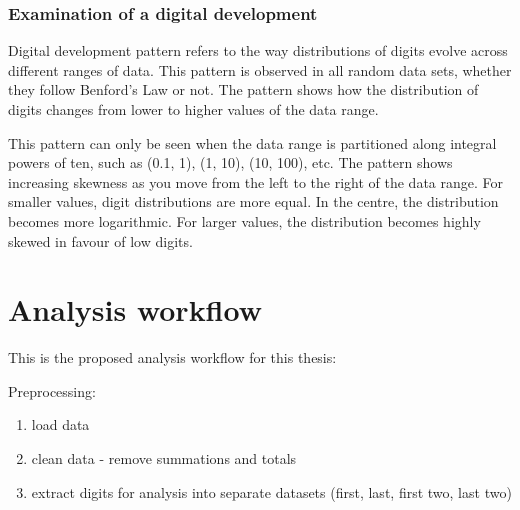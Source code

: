 

\subsubsection*{Examination of a digital development}

Digital development pattern refers to the way distributions of digits evolve across different ranges of data. This pattern is observed in all random data sets, whether they follow Benford's Law or not. The pattern shows how the distribution of digits changes from lower to higher values of the data range. 

This pattern can only be seen when the data range is partitioned along integral powers of ten, such as (0.1, 1), (1, 10), (10, 100), etc. The pattern shows increasing skewness as you move from the left to the right of the data range. For smaller values, digit distributions are more equal. In the centre, the distribution becomes more logarithmic. For larger values, the distribution becomes highly skewed in favour of low digits. \cite{kossovsky2014benford}







\section{Analysis workflow}

This is the proposed analysis workflow for this thesis: 

Preprocessing: 

\begin{enumerate}
    \item load data 
    \item clean data - remove summations and totals 
    \item extract digits for analysis into separate datasets (first, last, first two, last two) 
\end{enumerate}

